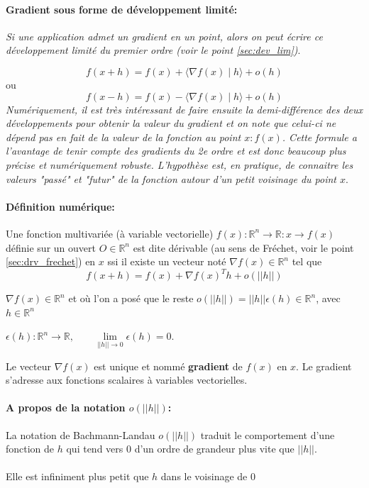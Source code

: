 		\paragraph*{Gradient sous forme de développement limité:}
		\textit{Si une application admet un gradient en un point, alors on peut écrire ce développement limité du premier ordre (voir le point \ref{sec:dev_lim})}.
		
		$${ 
			f(x+h)=f(x)+\langle \nabla f(x)\mid h\rangle +o(h) 
		}$$ 
		ou 
		$$ {  
			f(x-h)=f(x)-\langle \nabla f(x)\mid h\rangle +o(h)
		}$$
		\textit{Numériquement, il est très intéressant de faire ensuite la demi-différence des deux développements pour obtenir la valeur du gradient et on note que celui-ci ne dépend pas en fait de la valeur de la fonction au point $x : f (x)$. Cette formule a l'avantage de tenir compte des gradients du 2e ordre et est donc beaucoup plus précise et numériquement robuste. L'hypothèse est, en pratique, de connaitre les valeurs "passé" et "futur" de la fonction autour d'un petit voisinage du point $x$}\cite{jtshiman:2021}.\\
		\paragraph*{Définition numérique:}
		Une fonction multivariée (à variable vectorielle)
		$ f(x)	: \mathbb{R}^n \rightarrow \mathbb{R} : x \rightarrow f(x) $ définie sur un ouvert $O \in \mathbb{R}^n$ est dite dérivable (au sens de Fréchet, voir le point \ref{sec:drv_frechet}) en $x$ ssi il existe un vecteur noté $\nabla f(x) \in \mathbb{R}^n$ tel que
		\begin{equation}
			f(x+h) = f(x) + \nabla f(x)^{T}h + o(||h||)
		\end{equation}
		
		$\nabla f(x) \in \mathbb{R}^n$ et où l’on a posé que le reste $o(||h||) = ||h||\epsilon (h) \in \mathbb{R}^n$, avec $h \in \mathbb{R}^n$ 
		\begin{center}
			$\epsilon (h): \mathbb{R}^n\rightarrow \mathbb{R}, \qquad \lim\limits_{||h|| \rightarrow 0} \epsilon(h)=0$.
		\end{center} 
		Le vecteur $\nabla f(x)$ est unique et nommé \textbf{gradient} de $f(x)$ en $x$.
		Le gradient s’adresse aux fonctions scalaires à variables vectorielles.
		\paragraph*{A propos de la notation \textbf{$o(||h||)$}:}
		La notation de Bachmann-Landau $o(||h||)$ traduit le comportement d’une fonction de $h$ qui tend vers $0$ d’un ordre de grandeur plus vite que $||h||$.\\\\
		Elle est infiniment plus petit que $h$ dans le voisinage de $0$
		
